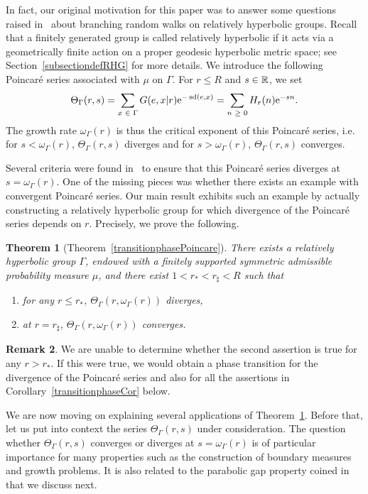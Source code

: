 \documentclass[10pt]{amsart}
\newtheorem{theo}{Theorem}[section]
\theoremstyle{definition}\newtheorem{defi}[theo]{Definition}\newtheorem{rema}[theo]{Remark}\newtheorem{exam}[theo]{Example}\newtheorem{exem}[theo]{Example}\newtheorem{nota}[theo]{Notation}
\newcommand{\R}{\mathbb{R}}
\newcommand{\rme}{\mathrm{e}}
\DeclareMathOperator{\sd}{sd}
\let\oldin\in
\renewcommand{\in}{\mathchoice{\oldin}{\oldin}{\,\oldin\,}{\,\oldin\,}}
\let\oldge\ge
\renewcommand{\ge}{\mathchoice{\oldge}{\oldge}{\,\oldge\,}{\,\oldge\,}}
\begin{document}
In fact, our original motivation for this paper was to answer some questions raised in~\cite{DWY} about branching random walks on relatively hyperbolic groups. Recall that a finitely generated group is called relatively hyperbolic if it acts via a geometrically finite action on a proper geodesic hyperbolic metric space; see Section~\ref{subsectiondefRHG} for more details. We introduce the following Poincaré series associated with $\mu$ on $\Gamma$. For $r\leq R$ and $s\in \R$, we set
\begin{align}\label{PoincareSeriesEQ}
\Theta_\Gamma(r,s)=\sum_{x\in \Gamma}G(e,x|r)\rme^{-\sd(e,x)}=\sum_{n\ge 0}H_r(n)\rme^{-sn}.
\end{align}
The growth rate $\omega_\Gamma(r)$ is thus the critical exponent of this Poincaré series, i.e. for $s<\omega_\Gamma(r)$, $\Theta_\Gamma(r,s)$ diverges and for $s>\omega_\Gamma(r)$, $\Theta_\Gamma(r,s)$ converges.

Several criteria were found in~\cite{DWY} to ensure that this Poincaré series diverges at $s=\omega_\Gamma(r)$. One of the missing pieces was whether there exists an example with convergent Poincaré series. Our main result exhibits such an example by actually constructing a relatively hyperbolic group for which divergence of the Poincaré series depends on $r$. Precisely, we prove the following.

\begin{theo}[{Theorem~\ref{transitionphasePoincare}}]\label{mainthm}
There exists a relatively hyperbolic group $\Gamma$, endowed with a finitely supported symmetric admissible probability measure $\mu$, and there exist $1<r_*<r_\sharp<R$ such that
\begin{enumerate}
\item\label{theo1.1.1} for any $r\leq r_*$, $\Theta_\Gamma(r,\omega_\Gamma(r))$ diverges,
\item\label{theo1.1.2} at $r=r_\sharp$, $\Theta_\Gamma(r,\omega_\Gamma(r))$ converges.
\end{enumerate}
\end{theo}

\begin{rema}
We are unable to determine whether the second assertion is true for any $r>r_*$. If this were true, we would obtain a phase transition for the divergence of the Poincaré series and also for all the assertions in Corollary~\ref{transitionphaseCor} below.
\end{rema}

We are now moving on explaining several applications of Theorem~\ref{mainthm}. Before that, let us put into context the series $\Theta_\Gamma(r,s)$ under consideration. The question whether $\Theta_\Gamma(r,s)$ converges or diverges at $s=\omega_\Gamma(r)$ is of particular importance for many properties such as the construction of boundary measures and growth problems. It is also related to the parabolic gap property coined in~\cite{DWY} that we discuss next.
\end{document}
